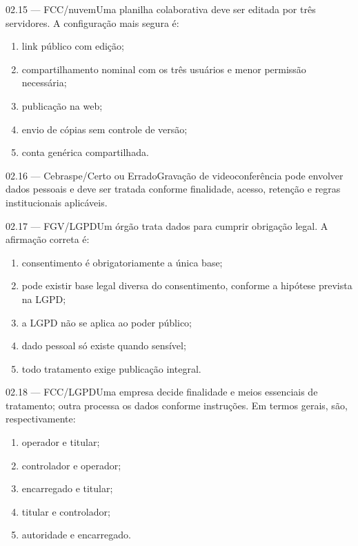 \begin{questao}{ 02.15 — FCC/nuvem}Uma planilha colaborativa deve ser editada por três servidores. A configuração mais segura é:\begin{enumerate}[label=\Alph*)]\item link público com edição;\item compartilhamento nominal com os três usuários e menor permissão necessária;\item publicação na web;\item envio de cópias sem controle de versão;\item conta genérica compartilhada.\end{enumerate}\end{questao}
\begin{questao}{ 02.16 — Cebraspe/Certo ou Errado}Gravação de videoconferência pode envolver dados pessoais e deve ser tratada conforme finalidade, acesso, retenção e regras institucionais aplicáveis.\end{questao}
\begin{questao}{ 02.17 — FGV/LGPD}Um órgão trata dados para cumprir obrigação legal. A afirmação correta é:\begin{enumerate}[label=\Alph*)]\item consentimento é obrigatoriamente a única base;\item pode existir base legal diversa do consentimento, conforme a hipótese prevista na LGPD;\item a LGPD não se aplica ao poder público;\item dado pessoal só existe quando sensível;\item todo tratamento exige publicação integral.\end{enumerate}\end{questao}
\begin{questao}{ 02.18 — FCC/LGPD}Uma empresa decide finalidade e meios essenciais de tratamento; outra processa os dados conforme instruções. Em termos gerais, são, respectivamente:\begin{enumerate}[label=\Alph*)]\item operador e titular;\item controlador e operador;\item encarregado e titular;\item titular e controlador;\item autoridade e encarregado.\end{enumerate}\end{questao}
